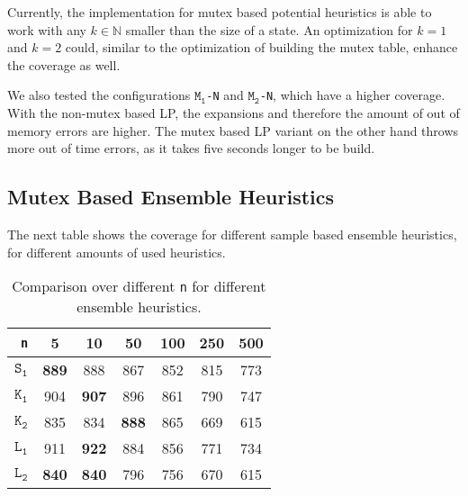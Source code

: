 Currently, the implementation for mutex based potential heuristics is able to work with any $k\in \mathbb{N}$ smaller than the size of a state.
An optimization for $k=1$ and $k=2$ could, similar to the optimization of building the mutex table, enhance the coverage as well.

We also tested the configurations $\texttt{M}_\texttt{1}$\texttt{-N} and $\texttt{M}_\texttt{2}$\texttt{-N}, which have a higher coverage.
With the non-mutex based LP, the expansions and therefore the amount of out of memory errors are higher.
The mutex based LP variant on the other hand throws more out of time errors, as it takes five seconds longer to be build.


\subsection{Mutex Based Ensemble Heuristics}\label{subsec:mutex-based-ensemble-heuristics}
The next table shows the coverage for different sample based ensemble heuristics, for different amounts of used heuristics.

\begin{table}[h!]
    \begin{center}
        \begin{tabular}{|r|c|c|c|c|c|c|}
            \hline
            \textbf{\texttt{n}} & \textbf{5} & \textbf{10} & \textbf{50} & \textbf{100} & \textbf{250} & \textbf{500} \\
            \hline \hline
            \textbf{$\texttt{S}_\texttt{1}$} & \textbf{889} & 888 & 867 & 852 & 815 & 773 \\ \hline
            \textbf{$\texttt{K}_\texttt{1}$} & 904 & \textbf{907} & 896 & 861 & 790 & 747 \\ \hline
            \textbf{$\texttt{K}_\texttt{2}$} & 835 & 834 & \textbf{888} & 865 & 669 & 615 \\ \hline
            \textbf{$\texttt{L}_\texttt{1}$} & 911 & \textbf{922} & 884 & 856 & 771 & 734 \\ \hline
            \textbf{$\texttt{L}_\texttt{2}$} & \textbf{840} & \textbf{840} & 796 & 756 & 670 & 615 \\ \hline
        \end{tabular}
        \caption{Comparison over different \texttt{n} for different ensemble heuristics.}
        \label{table:ensemble-n}
    \end{center}
\end{table}

